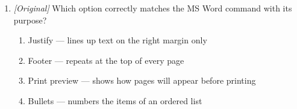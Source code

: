 \begin{enumerate}[label=\textbf{Q\arabic*.}, leftmargin=*]
\begin{enumerate}[label=\Alph*.]
    \item line spacing
    \item indentation
  \end{enumerate}
\item \textit{[Original]} Which option correctly matches the MS Word command
  with its purpose?
  \begin{enumerate}[label=\Alph*.]
    \item Justify --- lines up text on the right margin only
    \item Footer --- repeats at the top of every page
    \item Print preview --- shows how pages will appear before printing
    \item Bullets --- numbers the items of an ordered list
  \end{enumerate}


\end{enumerate}
